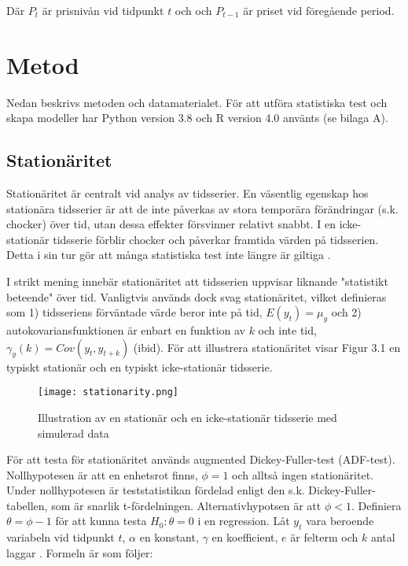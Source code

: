 \documentclass[11pt]{article}
\numberwithin{equation}{section}
\numberwithin{table}{section}
\numberwithin{figure}{section}
\begin{document}
Där $P_{t}$ är prisnivån vid tidpunkt $t$ och och $P_{t-1}$ är priset vid föregående period. 





\section{Metod}
Nedan beskrivs metoden och datamaterialet. För att utföra statistiska test och skapa modeller har Python version 3.8 och R version 4.0 använts (se bilaga A). 

\subsection{Stationäritet}
Stationäritet är centralt vid analys av tidsserier. En väsentlig egenskap hos stationära tidsserier är att de inte påverkas av stora temporära förändringar (s.k. chocker) över tid, utan dessa effekter försvinner relativt snabbt. I en icke-stationär tidsserie förblir chocker och påverkar framtida värden på tidsserien. Detta i sin tur gör att många statistiska test inte längre är giltiga \parencite[][,s.329 f.]{montgomery2015forecasting}. \par

I strikt mening innebär stationäritet att tidsserien uppvisar liknande "statistikt beteende" över tid. Vanligtvis används dock svag stationäritet, vilket definieras som 1) tidsseriens förväntade värde beror inte på tid, \(E(y_t)=\mu_y\) och 2) autokovariansfunktionen är enbart en funktion av $k$ och inte tid, \(\gamma_y(k) = Cov(y_t, y_{t+k})\) (ibid). För att illustrera stationäritet visar Figur 3.1 en typiskt stationär och en typiskt icke-stationär tidsserie.

\begin{figure}[H]
\caption{Illustration av en stationär och en icke-stationär tidsserie med simulerad data}
\texttt{[image: stationarity.png]}
\centering
\end{figure}

För att testa för stationäritet används augmented Dickey-Fuller-test (ADF-test). Nollhypotesen är att en enhetsrot finns, \(\phi=1\) och alltså ingen stationäritet. Under nollhypotesen är teststatistikan fördelad enligt den s.k. Dickey-Fuller-tabellen, som är snarlik t-fördelningen. Alternativhypotsen är att \(\phi<1\). Definiera \(\theta = \phi -1 \) för att kunna testa \(H_0:\theta=0\) i en regression. Låt \(y_t\) vara beroende variabeln vid tidpunkt $t$, \( \alpha \) en konstant, \( \gamma \) en koefficient, \(e\) är felterm och $k$ antal laggar \parencite[][,s.610 ff.]{wooldridge2018introductory}. Formeln är som följer:
\end{document}
